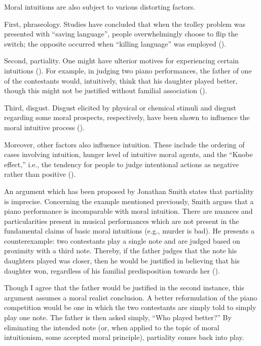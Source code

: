 \documentclass[12pt, a4paper, twoside]{article}
\begin{document}
Moral intuitions are also subject to various distorting factors.  

First, phraseology. Studies have concluded that when the trolley problem was presented with “saving language”, people overwhelmingly choose to flip the switch; the opposite occurred when “killing language” was employed (\cite[p.\ 6]{bengson2013experimental}).

Second, partiality. One might have ulterior motives for experiencing certain intuitions (\cite[pp.\ 343–346]{sinnott2006moral}). For example, in judging two piano performances, the father of one of the contestants would, intuitively, think that his daughter played better, though this might not be justified without familial association (\cite[p.\ 343]{sinnott2006moral}).

Third, disgust. Disgust elicited by physical or chemical stimuli and disgust regarding some moral prospects, respectively, have been shown to influence the moral intuitive process (\cite[p.\ 8]{tao2022effects}).

Moreover, other factors also influence intuition. These include the ordering of cases involving intuition, hunger level of intuitive moral agents, and the “Knobe effect,” i.e., the tendency for people to judge intentional actions as negative rather than positive (\cites{swain2008instability}[p.\ 1]{danziger2011extraneous}).

An argument which has been proposed by Jonathan Smith states that partiality is imprecise. Concerning the example mentioned previously, Smith argues that a piano performance is incomparable with moral intuition. There are nuances and particularities present in musical performances which are not present in the fundamental claims of basic moral intuitions (e.g., murder is bad). He presents a counterexample: two contestants play a single note and are judged based on proximity with a third note. Thereby, if the father judges that the note his daughters played was closer, then he would be justified in believing that his daughter won, regardless of his familial predisposition towards her (\cite[p.\ 77]{smith2010on}).

Though I agree that the father would be justified in the second instance, this argument assumes a moral realist conclusion. A better reformulation of the piano competition would be one in which the two contestants are simply told to simply play one note. The father is then asked simply, “Who played better?” By eliminating the intended note (or, when applied to the topic of moral intuitionism, some accepted moral principle), partiality comes back into play. 
\end{document}
